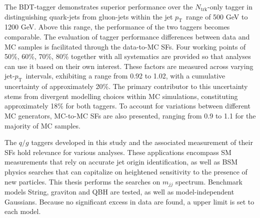 \documentclass[UTF8,12pt]{ctexart}
\numberwithin{equation}{section}
\renewcommand {\thefigure} {\thesection{}.\arabic{figure}}%
\renewcommand {\thetable} {\thesection{}.\arabic{table}}
\newcommand{\ntrk}{\ensuremath{N_{\mathrm{trk}}}\xspace}
\newcommand{\pt}{\ensuremath{p_{\mathrm{T}}\xspace}}
\def\mjj{$m_{jj}$ }
\begin{document}
The BDT-tagger demonstrates superior performance over the \ntrk-only tagger in distinguishing quark-jets from gluon-jets within the jet \pt~range of 500 GeV to 1200 GeV. Above this range, the performance of the two taggers becomes comparable. The evaluation of tagger performance differences between data and MC samples is facilitated through the data-to-MC SFs. Four working points of 50\%, 60\%, 70\%, 80\% together with all systematics are provided so that analyses can use it based on their own interest. These factors are measured across varying jet-\pt~intervals, exhibiting a range from 0.92 to 1.02, with a cumulative uncertainty of approximately 20\%. The primary contributor to this uncertainty stems from divergent modelling choices within MC simulations, constituting approximately 18\% for both taggers. To account for variations between different MC generators, MC-to-MC SFs are also presented, ranging from 0.9 to 1.1 for the majority of MC samples.

The $q/g$ taggers developed in this study and the associated measurement of their SFs hold relevance for various analyses. These applications encompass SM measurements that rely on accurate jet origin identification, as well as BSM physics searches that can capitalize on heightened sensitivity to the presence of new particles. This thesis performs the searches on \mjj spectrum. Benchmark models String, graviton and QBH are tested, as well as model-independent Gaussians. Because no significant excess in data are found, a upper limit is set to each model.







\newpage
{}
\renewcommand\refname{REFERENCES}



\printbibliography






%
%
%
%
%
%
\end{document}
